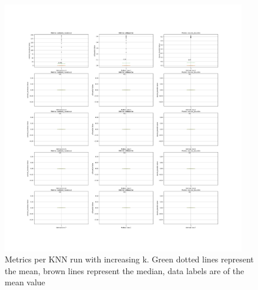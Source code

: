 \documentclass[12pt, a4paper]{article}
\begin{document}
                    \begin{figure}[H]
                        \begin{center}
                            \includegraphics[width=0.95\textwidth]{./knnRun1/full_run_metrics.png}
                        \end{center}
                        \caption{Metrics per KNN run with increasing k. Green dotted lines represent the mean, brown lines represent the median, data labels are of the mean value}\label{fig:Ksearch}
                    \end{figure}
\end{document}
